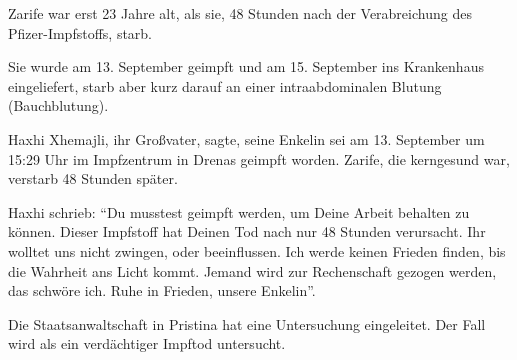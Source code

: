 Zarife war erst 23 Jahre alt, als sie, 48 Stunden nach der Verabreichung des
Pfizer-Impfstoffs, starb.

Sie wurde am 13. September geimpft und am 15. September ins Krankenhaus
eingeliefert, starb aber kurz darauf an einer intraabdominalen Blutung
(Bauchblutung).

Haxhi Xhemajli, ihr Großvater, sagte, seine Enkelin sei am 13. September um
15:29 Uhr im Impfzentrum in Drenas geimpft worden. Zarife, die kerngesund war,
verstarb 48 Stunden später.

Haxhi schrieb: ``Du musstest geimpft werden, um Deine Arbeit behalten zu
können. Dieser Impfstoff hat Deinen Tod nach nur 48 Stunden verursacht. Ihr
wolltet uns nicht zwingen, oder beeinflussen. Ich werde keinen Frieden finden,
bis die Wahrheit ans Licht kommt. Jemand wird zur Rechenschaft gezogen werden,
das schwöre ich. Ruhe in Frieden, unsere Enkelin''.

Die Staatsanwaltschaft in Pristina hat eine Untersuchung eingeleitet. Der Fall
wird als ein verdächtiger Impftod untersucht.
